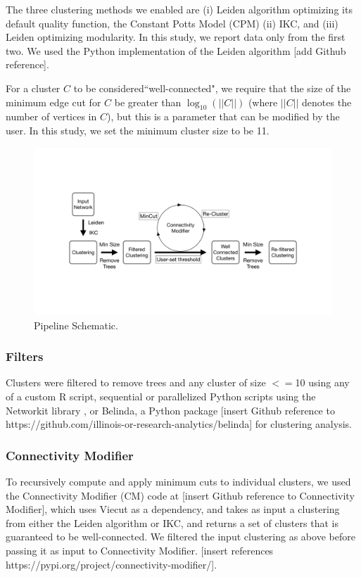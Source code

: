 \documentclass[12pt, oneside]{article}   	%
\begin{document}
The three clustering methods we enabled are (i) Leiden algorithm optimizing its default quality function, the Constant Potts Model (CPM) (ii) IKC, and (iii) Leiden optimizing modularity. In this study, we report data only from the first two. We used the Python implementation of the Leiden algorithm [add Github reference]. 

For  a cluster $C$ to be considered``well-connected", we require that the size of the minimum edge cut for $C$ be greater than $\log_{10}(||C||)$ (where $||C||$ denotes the number of vertices in $C$), but this is a parameter that can be modified by the user.  In this study, we set the minimum cluster size to be 11. 

\vspace{2 mm}

\begin{figure}[H]
\centering
\includegraphics[width=0.7\linewidth]{workflow.pdf}
\caption{Pipeline Schematic.}
\end{figure}



\subsubsection{Filters} Clusters were filtered to remove trees and any cluster of size $<=$10 using any of a custom R script, sequential or parallelized Python scripts using the Networkit library \citep{Staudt2016}, or Belinda, a Python package [insert Github reference to https://github.com/illinois-or-research-analytics/belinda] for clustering analysis.

\subsubsection{Connectivity Modifier} To recursively compute and apply minimum cuts to individual clusters, we used the Connectivity Modifier (CM) code at [insert Github reference to Connectivity Modifier], which uses Viecut \citep{Henzinger2018,Henzinger2019} as a dependency, and takes as input a clustering from either the Leiden algorithm or IKC, and returns a set of clusters that is guaranteed to be
well-connected. 
We filtered the input clustering as above before passing it as input to Connectivity Modifier. [insert references https://pypi.org/project/connectivity-modifier/].
\end{document}
